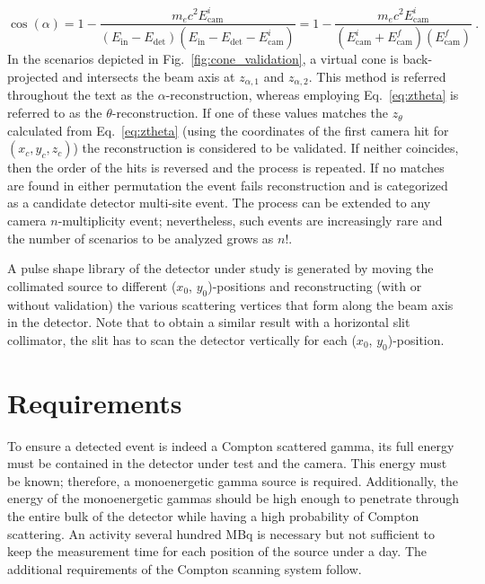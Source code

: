 \begin{equation} \label{eq:compton_alpha}
    \cos(\alpha) = 1 - \dfrac{m_ec^2 E_\text{cam}^i}{(E_\text{in} - E_\text{det}) \left(E_\text{in} - E_\text{det} - E_\text{cam}^i\right)} = 1 - \dfrac{m_ec^2 E_\text{cam}^i}{(E_\text{cam}^i + E_\text{cam}^f) \left(E_\text{cam}^f\right)}~.
\end{equation}
In the scenarios depicted in Fig.~\ref{fig:cone_validation}, a virtual cone is back-projected and intersects the beam axis at $z_{\alpha,1}$ and $z_{\alpha,2}$. This method is referred throughout the text as the $\alpha$-reconstruction, whereas employing Eq.~\ref{eq:ztheta} is referred to as the $\theta$-reconstruction. If one of these values matches the $z_\theta$ calculated from Eq.~\ref{eq:ztheta} (using the coordinates of the first camera hit for $(x_c, y_c, z_c)$) the reconstruction is considered to be validated. If neither coincides, then the order of the hits is reversed and the process is repeated. If no matches are found in either permutation the event fails reconstruction and is categorized as a candidate detector multi-site event. The process can be extended to any camera $n$-multiplicity event; nevertheless, such events are increasingly rare and the number of scenarios to be analyzed grows as $n!$.

A pulse shape library of the detector under study is generated by moving the collimated source to different ($x_0$, $y_0$)-positions and reconstructing (with or without validation) the various scattering vertices that form along the beam axis in the detector. Note that to obtain a similar result with a horizontal slit collimator, the slit has to scan the detector vertically for each ($x_0$, $y_0$)-position.

\section{Requirements} \label{sec:requirements}

To ensure a detected event is indeed a Compton scattered gamma, its full energy must be contained in the detector under test and the camera. This energy must be known; therefore, a monoenergetic gamma source is required. Additionally, the energy of the monoenergetic gammas should be high enough to penetrate through the entire bulk of the detector while having a high probability of Compton scattering. An activity several hundred MBq is necessary but not sufficient to keep the measurement time for each position of the source under a day. The additional requirements of the Compton scanning system follow.

